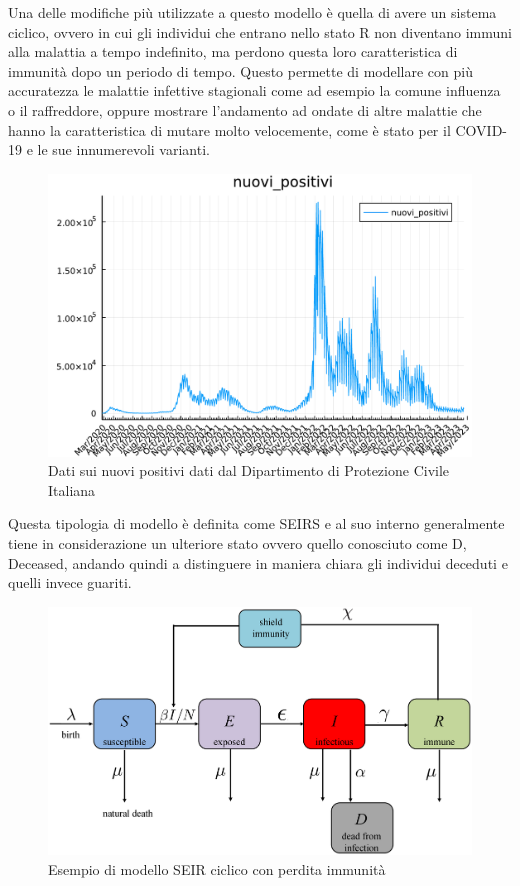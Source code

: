 Una delle modifiche più utilizzate a questo modello è quella di avere un sistema 
ciclico, ovvero in cui gli individui che entrano nello stato R non diventano immuni 
alla malattia a tempo indefinito, ma perdono questa loro caratteristica di immunità
dopo un periodo di tempo. Questo permette di modellare con più accuratezza le malattie
infettive stagionali come ad esempio la comune influenza o il raffreddore, oppure 
mostrare l'andamento ad ondate di altre malattie che hanno la caratteristica di 
mutare molto velocemente, come è stato per il COVID-19 e le sue innumerevoli varianti.

\begin{figure}
    \includegraphics[width=\linewidth]{img/nuovi_positivi_2023-04-21.pdf}
    \caption{Dati sui nuovi positivi dati dal Dipartimento di Protezione Civile Italiana}
    \label{fig:DPC_new_positive}
\end{figure}

Questa tipologia di modello è definita come SEIRS e al suo interno generalmente 
tiene in considerazione un ulteriore stato ovvero quello conosciuto come D, Deceased,
andando quindi a distinguere in maniera chiara gli individui deceduti e quelli invece
guariti. 

\begin{figure}
    \includegraphics[width=\linewidth]{img/journal.pone.0247660.g002.PNG}
    \caption{Esempio di modello SEIR ciclico con perdita immunità}
    \label{fig:SEIR_ciclic}
\end{figure}

